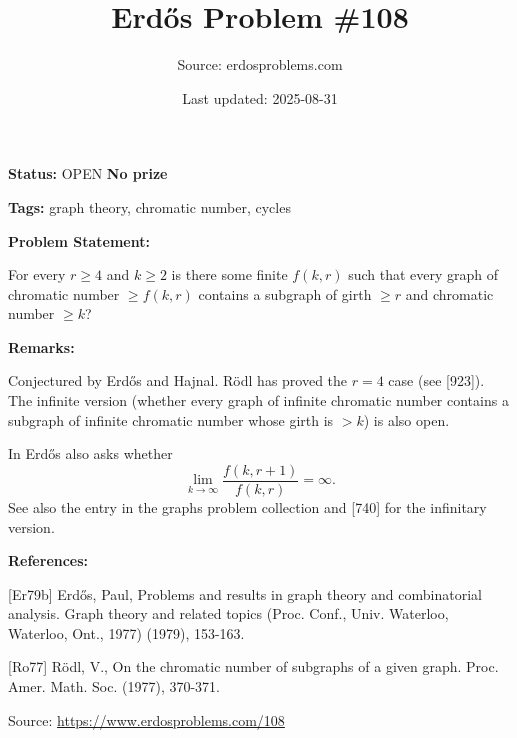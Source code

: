 \documentclass{article}
\title{Erd\H{o}s Problem \#108}
\date{Last updated: 2025-08-31}
\author{Source: erdosproblems.com}
\begin{document}
\maketitle

\noindent\textbf{Status:} OPEN \quad \textbf{No prize}

\noindent\textbf{Tags:} graph theory, chromatic number, cycles

\medskip
\noindent\textbf{Problem Statement:}

For every $r\geq 4$ and $k\geq 2$ is there some finite $f(k,r)$ such that every graph of chromatic number $\geq f(k,r)$ contains a subgraph of girth $\geq r$ and chromatic number $\geq k$?

\bigskip
\noindent\textbf{Remarks:}

Conjectured by Erd\H{o}s and Hajnal. R\"{o}dl \cite{Ro77} has proved the $r=4$ case (see [923]). The infinite version (whether every graph of infinite chromatic number contains a subgraph of infinite chromatic number whose girth is $>k$) is also open.

In \cite{Er79b} Erd\H{o}s also asks whether\[\lim_{k\to \infty}\frac{f(k,r+1)}{f(k,r)}=\infty.\]See also the entry in the graphs problem collection and [740] for the infinitary version.

\bigskip
\noindent\textbf{References:}

[Er79b] Erd\H{o}s, Paul, Problems and results in graph theory and combinatorial analysis. Graph theory and related topics (Proc. Conf., Univ. Waterloo, Waterloo, Ont., 1977) (1979), 153-163.
 
 [Ro77] R\"{o}dl, V., On the chromatic number of subgraphs of a given graph. Proc. Amer. Math. Soc. (1977), 370-371.

\bigskip
\noindent\small{Source: \url{https://www.erdosproblems.com/108}}
\end{document}
